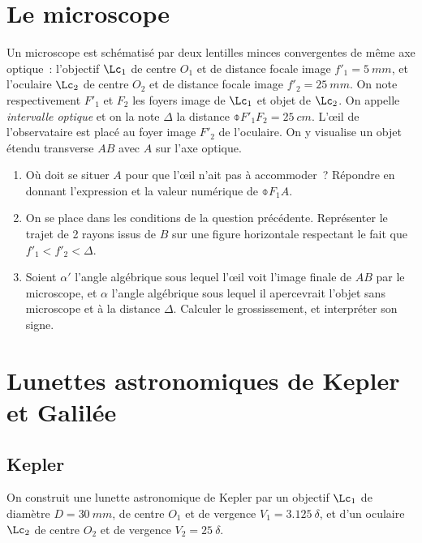\documentclass[a4paper, 12pt, final, garamond]{book}
\begin{document}
\section{Le microscope}

Un microscope est schématisé par deux lentilles minces convergentes de même axe
optique~: l'objectif $\Lc_1$ de centre $O_1$ et de distance focale image $f'_1 =
\SI{5}{mm}$, et l'oculaire $\Lc_2$ de centre $O_2$ et de distance focale image
$f'_2 = \SI{25}{mm}$. On note respectivement $F'_1$ et $F_2$ les foyers image de
$\Lc_1$ et objet de $\Lc_2$. On appelle \textit{intervalle optique} et on la
note $\Delta$ la distance $\obar{F'_1F_2} = \SI{25}{cm}$. L'œil de
l'observataire est placé au foyer image $F'_2$ de l'oculaire. On y visualise un
objet étendu transverse $AB$ avec $A$ sur l'axe optique.

\begin{enumerate}
    \item Où doit se situer $A$ pour que l'œil n'ait pas à accommoder~? Répondre
        en donnant l'expression et la valeur numérique de $\obar{F_1A}$.
    \item On se place dans les conditions de la question précédente. Représenter
        le trajet de 2 rayons issus de $B$ sur une figure horizontale respectant
        le fait que $f'_1 < f'_2 < \Delta$.
    \item Soient $\alpha'$ l'angle algébrique sous lequel l'œil voit l'image
        finale de $AB$ par le microscope, et $\alpha$ l'angle algébrique sous
        lequel il apercevrait l'objet sans microscope et à la distance $\Delta$.
        Calculer le grossissement, et interpréter son signe.
\end{enumerate}

\section{Lunettes astronomiques de Kepler et Galilée}

\subsection{Kepler}

On construit une lunette astronomique de Kepler par un objectif $\Lc_1$ de
diamètre $D = \SI{30}{mm}$, de centre $O_1$ et de vergence $V_1 =
\SI{3.125}{\delta}$, et d'un oculaire $\Lc_2$ de centre $O_2$ et de vergence
$V_2 = \SI{25}{\delta}$.
\end{document}
